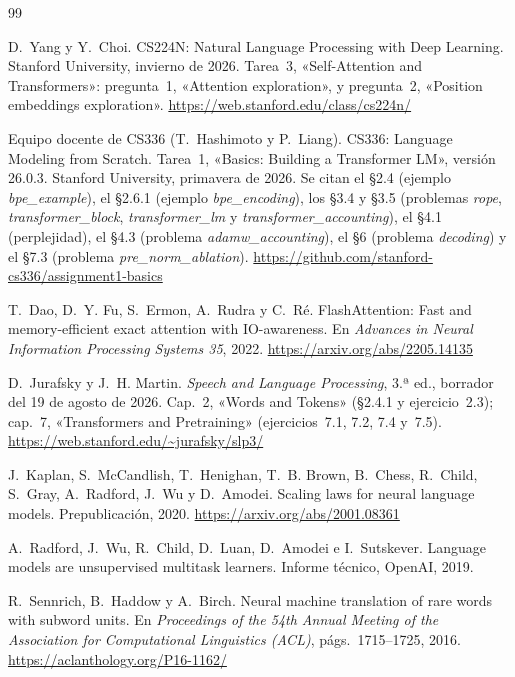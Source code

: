 \begin{thebibliography}{99}
\small

D.~Yang y Y.~Choi.
\newblock CS224N: Natural Language Processing with Deep Learning.
\newblock Stanford University, invierno de 2026. Tarea~3, «Self-Attention and Transformers»: pregunta~1, «Attention exploration», y pregunta~2, «Position embeddings exploration».
\newblock \url{https://web.stanford.edu/class/cs224n/}

Equipo docente de CS336 (T.~Hashimoto y P.~Liang).
\newblock CS336: Language Modeling from Scratch. Tarea~1, «Basics: Building a Transformer LM», versión 26.0.3.
\newblock Stanford University, primavera de 2026. Se citan el §2.4 (ejemplo \emph{bpe\_example}), el §2.6.1 (ejemplo \emph{bpe\_encoding}), los §3.4 y §3.5 (problemas \emph{rope}, \emph{transformer\_block}, \emph{transformer\_lm} y \emph{transformer\_accounting}), el §4.1 (perplejidad), el §4.3 (problema \emph{adamw\_accounting}), el §6 (problema \emph{decoding}) y el §7.3 (problema \emph{pre\_norm\_ablation}).
\newblock \url{https://github.com/stanford-cs336/assignment1-basics}

T.~Dao, D.~Y. Fu, S.~Ermon, A.~Rudra y C.~Ré.
\newblock FlashAttention: Fast and memory-efficient exact attention with IO-awareness.
\newblock En \emph{Advances in Neural Information Processing Systems 35}, 2022.
\newblock \url{https://arxiv.org/abs/2205.14135}

D.~Jurafsky y J.~H. Martin.
\newblock \emph{Speech and Language Processing}, 3.ª ed., borrador del 19 de agosto de 2026.
\newblock Cap.~2, «Words and Tokens» (§2.4.1 y ejercicio~2.3); cap.~7, «Transformers and Pretraining» (ejercicios~7.1, 7.2, 7.4 y~7.5).
\newblock \url{https://web.stanford.edu/~jurafsky/slp3/}

J.~Kaplan, S.~McCandlish, T.~Henighan, T.~B. Brown, B.~Chess, R.~Child, S.~Gray, A.~Radford, J.~Wu y D.~Amodei.
\newblock Scaling laws for neural language models.
\newblock Prepublicación, 2020.
\newblock \url{https://arxiv.org/abs/2001.08361}

A.~Radford, J.~Wu, R.~Child, D.~Luan, D.~Amodei e I.~Sutskever.
\newblock Language models are unsupervised multitask learners.
\newblock Informe técnico, OpenAI, 2019.

R.~Sennrich, B.~Haddow y A.~Birch.
\newblock Neural machine translation of rare words with subword units.
\newblock En \emph{Proceedings of the 54th Annual Meeting of the Association for Computational Linguistics (ACL)}, págs.~1715--1725, 2016.
\newblock \url{https://aclanthology.org/P16-1162/}


\end{thebibliography}
